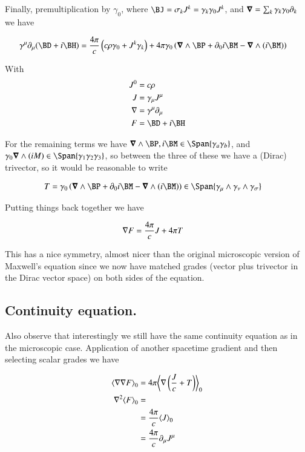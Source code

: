 Finally, premultiplication by $\gamma_0$, where $\BJ = \sigma_k J^k = \gamma_k \gamma_0 J^k$, and $\boldsymbol{\nabla} = \sum_k \gamma_k \gamma_0 \partial_k$ we have

\begin{align}
\gamma^\mu \partial_\mu (\BD + i \BH)
&=
\frac{4 \pi}{c} \left( c \rho \gamma_0 + J^k \gamma_k \right)
+ {4 \pi \gamma_0} \left( \spacegrad \wedge \BP + \partial_0 { i \BM }  - \spacegrad \wedge (i\BM) \right)
\end{align}

With 
\begin{align}
J^0 &= c \rho \\
J &= \gamma_\mu J^\mu \\
\grad &= \gamma^\mu \partial_\mu \\
F &= \BD + i\BH
\end{align}

For the remaining terms we have $\spacegrad \wedge \BP, i\BM \in \Span\{\gamma_a \gamma_b\}$, and $\gamma_0 \spacegrad \wedge (iM) \in \Span{ \gamma_1 \gamma_2 \gamma_3}$, so between the three of these we have a (Dirac) trivector, so it would be reasonable to write

\begin{align}
T &= {\gamma_0} \left( \spacegrad \wedge \BP + \partial_0 { i \BM }  - \spacegrad \wedge (i\BM) \right) \in \Span\{ \gamma_\mu \wedge \gamma_\nu \wedge \gamma_\sigma\} 
\end{align}

Putting things back together we have

\begin{align}
\nabla F &= \frac{4\pi}{c} J + 4\pi T
\end{align}

This has a nice symmetry, almost nicer than the original microscopic version of Maxwell's equation since we now have matched grades (vector plus trivector in the Dirac vector space) on both sides of the equation.

\subsection{Continuity equation. }

Also observe that interestingly we still have the same continuity equation as in the microscopic case.  Application of another spacetime gradient and then selecting scalar grades we have

\begin{align*}
{\left\langle{{ \nabla\nabla F }}\right\rangle}_{0} &= 4 \pi {\left\langle{{ \nabla\left( \frac{J}{c} + T \right) }}\right\rangle}_{0}  \\
\nabla^2 {\left\langle{{ F }}\right\rangle}_{0} &= \\
&= \frac{ 4 \pi }{c} {\left\langle{{ J }}\right\rangle}_{0} \\
&= \frac{ 4 \pi }{c} \partial_\mu J^\mu \\
\end{align*}

